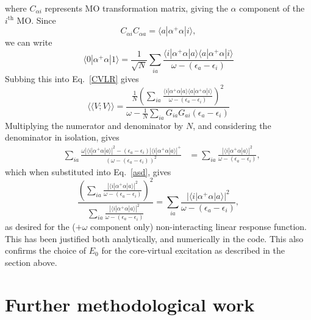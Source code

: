\documentclass[a4paper,oneside,11pt]{article}
\numberwithin{equation}{section}
\begin{document}
where $C_{\alpha i}$ represents MO transformation matrix, giving the $\alpha$ component of the $i^{\textrm{th}}$ MO.
Since
\begin{equation}
C_{\alpha i} C_{\alpha a} = \langle a | \alpha^{+} \alpha | i \rangle ,
\end{equation}
we can write
\begin{equation}
\langle 0 | \alpha^{+} \alpha | 1 \rangle = \frac{1}{\sqrt{N}} \sum_{ia} \frac{\langle i | \alpha^{+} \alpha | a \rangle \langle a | \alpha^{+} \alpha | i \rangle}{\omega - (\epsilon_a - \epsilon_i)}
\end{equation}
Subbing this into Eq.~\ref{CVLR} gives
\begin{equation}
\langle \langle V ; V \rangle \rangle = \frac{ \frac{1}{N} \left( \sum_{ia} \frac{\langle i | \alpha^{+} \alpha | a \rangle \langle a | \alpha^{+} \alpha | i \rangle }{ \omega - (\epsilon_a - \epsilon_i)} \right)^2}{\omega - \frac{1}{N} \sum_{ia} G_{ia} G_{ai} (\epsilon_a - \epsilon_i)} \label{asd}
\end{equation}
Multiplying the numerator and denominator by $N$, and considering the denominator in isolation, gives
\begin{align}
& \sum_{ia} \frac{\omega|\langle i | \alpha^{+} \alpha | a \rangle |^2 - (\epsilon_a - \epsilon_i) |\langle i | \alpha^{+} \alpha | a \rangle |^{+}}{(\omega - (\epsilon_a - \epsilon_i))^2}
&=\sum_{ia} \frac{|\langle i | \alpha^{+} \alpha | a \rangle|^2}{\omega - (\epsilon_a - \epsilon_i)} , 
\end{align}
which when substituted into Eq.~\ref{asd}, gives
\begin{equation}
\frac{ \left( \sum_{ia} \frac{|\langle i | \alpha^{+} \alpha | a \rangle |^2}{\omega - (\epsilon_a - \epsilon_i)} \right)^2}{\sum_{ia} \frac{|\langle i | \alpha^{+} \alpha | a \rangle |^2}{\omega - (\epsilon_a - \epsilon_i)}} = \sum_{ia} \frac{|\langle i | \alpha^{+} \alpha | a \rangle |^2}{\omega - (\epsilon_a - \epsilon_i)} ,
\end{equation}
as desired for the ($+ \omega$ component only) non-interacting linear response function. This has been justified both analytically, and numerically in the code.
This also confirms the choice of $E_0$ for the core-virtual excitation as described in the section above.

\section{Further methodological work}
\end{document}

